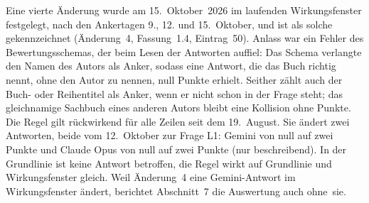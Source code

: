 \documentclass[11pt]{article}
\begin{document}
Eine vierte Änderung wurde am 15.~Oktober~2026 im laufenden Wirkungsfenster festgelegt, nach den Ankertagen 9., 12. und 15.~Oktober, und ist als solche gekennzeichnet (Änderung~4, Fassung~1.4, Eintrag~50). Anlass war ein Fehler des Bewertungsschemas, der beim Lesen der Antworten auf\/fiel: Das Schema verlangte den Namen des Autors als Anker, sodass eine Antwort, die das Buch richtig nennt, ohne den Autor zu nennen, null Punkte erhielt. Seither zählt auch der Buch- oder Reihentitel als Anker, wenn er nicht schon in der Frage steht; das gleichnamige Sachbuch eines anderen Autors bleibt eine Kollision ohne Punkte. Die Regel gilt rückwirkend für alle Zeilen seit dem 19.~August. Sie ändert zwei Antworten, beide vom 12.~Oktober zur Frage L1: Gemini von null auf zwei Punkte und Claude Opus von null auf zwei Punkte (nur beschreibend). In der Grundlinie ist keine Antwort betroffen, die Regel wirkt auf Grundlinie und Wirkungsfenster gleich. Weil Änderung~4 eine Gemini-Antwort im Wirkungsfenster ändert, berichtet Abschnitt~7 die Auswertung auch ohne~\mbox{sie.}
\end{document}
